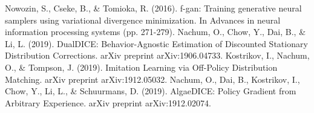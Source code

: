 \documentclass[a4paper]{article}
\theoremstyle{definition}
\begin{document}
\begin{thebibliography}{99}  
Nowozin, S., Cseke, B., \& Tomioka, R. (2016). f-gan: Training generative neural samplers using variational divergence minimization. In Advances in neural information processing systems (pp. 271-279).  
Nachum, O., Chow, Y., Dai, B., \& Li, L. (2019). DualDICE: Behavior-Agnostic Estimation of Discounted Stationary Distribution Corrections. arXiv preprint arXiv:1906.04733.
Kostrikov, I., Nachum, O., \& Tompson, J. (2019). Imitation Learning via Off-Policy Distribution Matching. arXiv preprint arXiv:1912.05032.
Nachum, O., Dai, B., Kostrikov, I., Chow, Y., Li, L., \& Schuurmans, D. (2019). AlgaeDICE: Policy Gradient from Arbitrary Experience. arXiv preprint arXiv:1912.02074.
\end{thebibliography}
\end{document}
